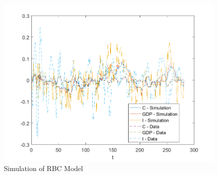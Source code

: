 \documentclass[12pt]{article}
\theoremstyle{definition}
\begin{document}
\begin{enumerate}[1.]
	\begin{figure}[H]
	\centering
	\includegraphics[width=\linewidth]{plot_sim_ex}
	\caption{Simulation of RBC Model}
	\label{fig:plotsimex}
\end{figure}
\end{enumerate}
\end{document}
